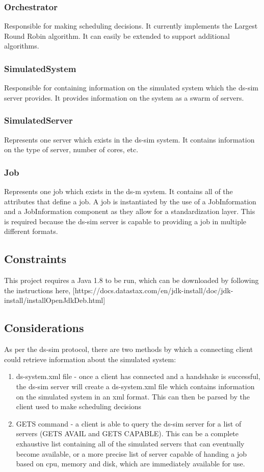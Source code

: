 \documentclass[a4paper]{article}
\begin{document}
\subsubsection*{Orchestrator}
Responsible for making scheduling decisions. It currently implements the Largest Round Robin algorithm. It can easily be extended to support additional algorithms.

\subsubsection*{SimulatedSystem}
Responsible for containing information on the simulated system which the ds-sim server provides. It provides information on the system as a swarm of servers.

\subsubsection*{SimulatedServer}
Represents one server which exists in the ds-sim system. It contains information on the type of server, number of cores, etc.

\subsubsection*{Job}
Represents one job which exists in the ds-m system. It contains all of the attributes that define a job. A job is instantiated by the use of a JobInformation and a JobInformation component as they allow for a standardization layer. This is required because the ds-sim server is capable to providing a job in multiple different formats.

\subsection{Constraints}
This project requires a Java 1.8 to be run, which can be downloaded by following the instructions here, [https://docs.datastax.com/en/jdk-install/doc/jdk-install/installOpenJdkDeb.html]

\subsection{Considerations}
As per the ds-sim protocol, there are two methods by which a connecting client could retrieve information about the simulated system:
\begin{enumerate}
  \item ds-system.xml file - once a client has connected and a handshake is successful, the ds-sim server will create a ds-system.xml file which contains information on the simulated system in an xml format. This can then be parsed by the client used to make scheduling decisions
  \item GETS command - a client is able to query the ds-sim server for a list of servers (GETS AVAIL and GETS CAPABLE). This can be a complete exhaustive list containing all of the simulated servers that can eventually become available, or a more precise list of server capable of handing a job based on cpu, memory and disk, which are immediately available for use.
\end{enumerate}
\end{document}
